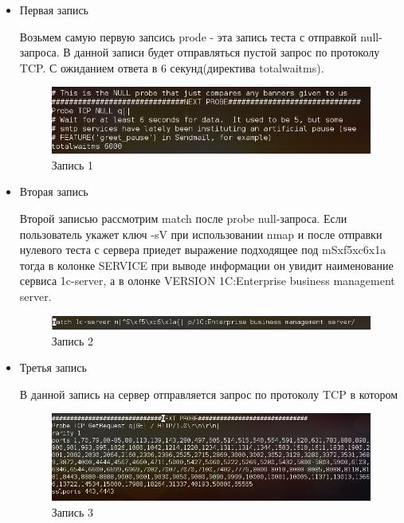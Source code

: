 \documentclass[11pt, a4paper]{article}		%
\begin{document}
\begin{itemize}
\item Первая запись

Возьмем самую первую запсись prode - эта запись теста с отправкой null-запроса. В данной записи будет отправляться пустой запрос по протоколу TCP. С ожиданием ответа в 6 секунд(директива totalwaitms).

\begin{figure}[h!]
\centering
\includegraphics[scale=0.75]{res/probe_1}
\caption{Запись 1}
\end{figure}

\item Вторая запись

Второй записью рассмотрим match после probe null-запроса. Если пользователь укажет ключ -sV при использовании nmap и после отправки нулевого теста с сервера приедет выражение подходящее под mSxf5xc6x1a тогда в колонке SERVICE при выводе информации он увидит наименование сервиса 1c-server, а в олонке VERSION 1C:Enterprise business management server.

\begin{figure}[h!]
\centering
\includegraphics[scale=0.75]{res/probe_2}
\caption{Запись 2}
\end{figure}

\item Третья запись

В данной запись на сервер отправляется запрос по протоколу TCP в котором



\begin{figure}[h!]
\centering
\includegraphics[scale=0.75]{res/probe_3}
\caption{Запись 3}
\end{figure}



\end{itemize}
\end{document}
